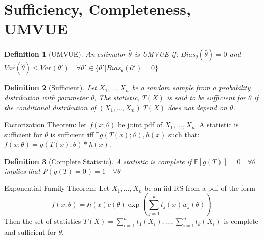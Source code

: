 \documentclass[10pt]{article}
\newtheorem{definition}{Definition}[section]
\begin{document}
\section{Sufficiency, Completeness, UMVUE}
\begin{definition}[UMVUE]
    An estimator $\hat{\theta}$ is UMVUE if: 
    $Bias_\theta(\hat{\theta}) = 0$ and 
    $Var(\hat{\theta}) \leq Var(\theta') \quad \forall \theta' \in \{\theta' | Bias_\theta(\theta') = 0\}$
\end{definition}
\begin{definition} [Sufficient]
    Let $X_1, \dots, X_n$ be a random sample from a probability distribution with parameter $\theta$,
    The statistic, $T(X)$ is said to be sufficient for $\theta$ if the conditional distribution of $(X_1, \dots, X_n) | T(X)$
    does not depend on $\theta$.
\end{definition}
Factorization Theorem: let $f(x; \theta)$ be joint pdf of $X_1, \dots, X_n$. 
A statistic is sufficient for $\theta$ is sufficient iff $\exists g(T(x); \theta), h(x)$ such that:
$f(x; \theta) = g(T(x) ; \theta) * h(x)$. 
\begin{definition}[Complete Statistic]
    A statistic is complete if $\mathbb{E}[g(T)] = 0 \quad \forall \theta$ implies that $P(g(T) = 0) = 1 \quad \forall \theta$
\end{definition}
Exponential Family Theorem: Let $X_1, \dots, X_n$ be an iid RS from a pdf of the form
$$f(x;\theta) = h(x) c(\theta) \exp \left( \sum_{j=1}^k t_j(x) w_j(\theta) \right)$$
Then the set of statistics $T(X) = \sum_{i=1}^n t_1(X_i), \dots, \sum_{i=1}^n t_k(X_i)$ is complete and sufficient for $\theta$.
\end{document}
